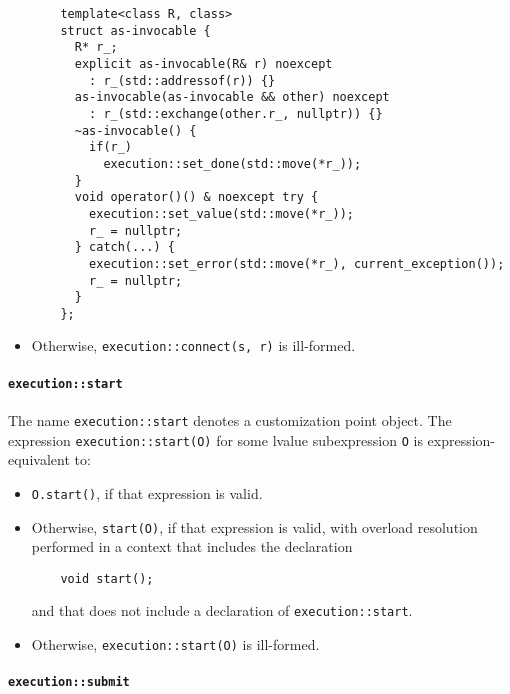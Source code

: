 \documentclass[a4paper,12pt,notitlepage,twoside,openright]{article}
\begin{document}
\begin{itemize}
  \begin{verbatim}
    template<class R, class>
    struct as-invocable {
      R* r_;
      explicit as-invocable(R& r) noexcept
        : r_(std::addressof(r)) {}
      as-invocable(as-invocable && other) noexcept
        : r_(std::exchange(other.r_, nullptr)) {}
      ~as-invocable() {
        if(r_)
          execution::set_done(std::move(*r_));
      }
      void operator()() & noexcept try {
        execution::set_value(std::move(*r_));
        r_ = nullptr;
      } catch(...) {
        execution::set_error(std::move(*r_), current_exception());
        r_ = nullptr;
      }
    };
  \end{verbatim}
\item
  Otherwise, \texttt{execution::connect(s, r)} is
  ill-formed.
\end{itemize}

\hypertarget{executionstart}{%
\paragraph{\texorpdfstring{\texttt{execution::start}}{}}\label{executionstart}}

The name \texttt{execution::start} denotes a customization
point object. The expression \texttt{execution::start(O)}
for some lvalue subexpression \texttt{O} is
expression-equivalent to:

\begin{itemize}
\item
  \texttt{O.start()}, if that expression is valid.
\item
  Otherwise, \texttt{start(O)}, if that expression is valid,
  with overload resolution performed in a context that includes the
  declaration

  \begin{verbatim}
    void start();
  \end{verbatim}

  and that does not include a declaration of
  \texttt{execution::start}.
\item
  Otherwise, \texttt{execution::start(O)} is ill-formed.
\end{itemize}

\hypertarget{executionsubmit}{%
\paragraph{\texorpdfstring{\texttt{execution::submit}}{}}\label{executionsubmit}}
\end{document}
